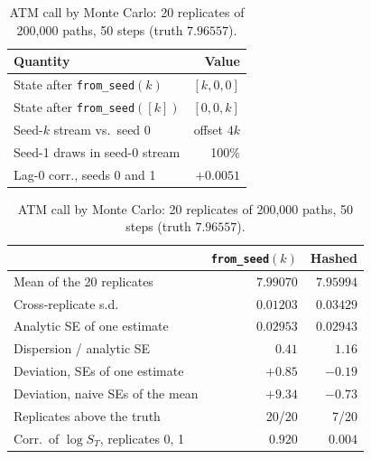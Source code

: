 \documentclass{article}
\newcommand{\fromseed}{\texttt{from\_seed}}
\begin{document}
\begin{table}[t]
  \centering
  \begin{minipage}[t]{0.405\linewidth}
    \centering
    \caption{The mechanism in TensorFlow~2.21.}
    \label{tab:mechanism}
    \footnotesize
    \begin{tabular}{@{}lr@{}}
      \toprule
      Quantity & Value \\
      \midrule
      State after \fromseed{}$(k)$ & $[k, 0, 0]$ \\
      State after \fromseed{}$([k])$ & $[0, 0, k]$ \\
      Seed-$k$ stream vs.\ seed 0 & offset $4k$ \\
      Seed-1 draws in seed-0 stream & 100\% \\
      Lag-0 corr., seeds 0 and 1 & $+0.0051$ \\
      \bottomrule
    \end{tabular}
  \end{minipage}\hfill
  \begin{minipage}[t]{0.56\linewidth}
    \centering
    \caption{ATM call by Monte Carlo: 20 replicates of 200{,}000 paths, 50 steps (truth
      $7.96557$).}
    \label{tab:consequence}
    \footnotesize
    \begin{tabular}{@{}lrr@{}}
      \toprule
       & \fromseed{}$(k)$ & Hashed \\
      \midrule
      Mean of the 20 replicates & $7.99070$ & $7.95994$ \\
      Cross-replicate s.d. & $0.01203$ & $0.03429$ \\
      Analytic SE of one estimate & $0.02953$ & $0.02943$ \\
      Dispersion / analytic SE & $0.41$ & $1.16$ \\
      Deviation, SEs of one estimate & $+0.85$ & $-0.19$ \\
      Deviation, naive SEs of the mean & $+9.34$ & $-0.73$ \\
      Replicates above the truth & 20/20 & 7/20 \\
      Corr.\ of $\log S_T$, replicates 0, 1 & $0.920$ & $0.004$ \\
      \bottomrule
    \end{tabular}
  \end{minipage}
\end{table}
\end{document}
